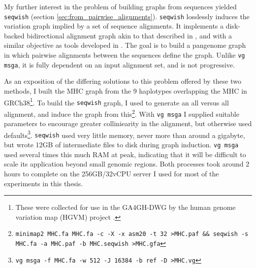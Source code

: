 My further interest in the problem of building graphs from sequences yielded {\tt seqwish} (section \ref{sec:from_pairwise_alignments}).
{\tt seqwish} losslessly induces the variation graph implied by a set of sequence alignments.
It implements a disk-backed bidirectional alignment graph akin to that described in \cite{kehr2014genome}, and with a similar objective as tools developed in \cite{jandrasits2018seq}.
The goal is to build a pangenome graph in which pairwise alignments between the sequences define the graph.
Unlike {\tt vg msga}, it is fully dependent on an input alignment set, and is not progressive.

As an exposition of the differing solutions to this problem offered by these two methods, I built the MHC graph from the 9 haplotypes overlapping the MHC in GRCh38\footnote{These were collected for use in the GA4GH-DWG by the human genome variation map (HGVM) project \cite{blow2015decoding}.}.
To build the {\tt seqwish} graph, I used \cite{li2018minimap2} to generate an all versus all alignment, and induce the graph from this\footnote{{\tt minimap2 MHC.fa MHC.fa -c -X -x asm20 -t 32 >MHC.paf \&\& seqwish -s MHC.fa -a MHC.paf -b MHC.seqwish >MHC.gfa}}.
With {\tt vg msga} I supplied suitable parameters to encourage greater colliniearity in the alignment, but otherwise used defaults\footnote{{\tt vg msga -f MHC.fa -w 512 -J 16384 -b ref -D >MHC.vg}}.
{\tt seqwish} used very little memory, never more than around a gigabyte, but wrote 12GB of intermediate files to disk during graph induction.
{\tt vg msga} used several times this much RAM at peak, indicating that it will be difficult to scale its application beyond small genomic regions.
Both processes took around 2 hours to complete on the 256GB/32vCPU server I used for most of the experiments in this thesis.

